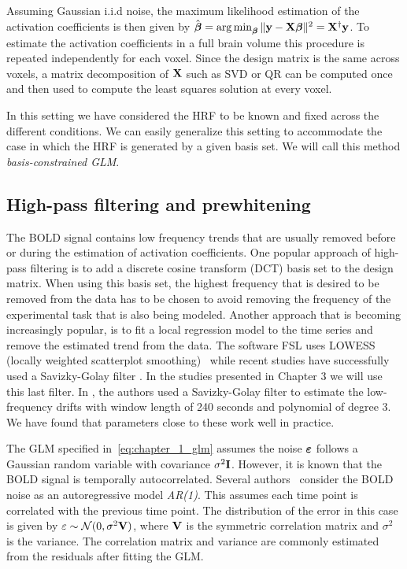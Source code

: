 Assuming Gaussian i.i.d noise, the maximum likelihood estimation of the activation coefficients is then given by $\hat{{\boldsymbol \beta}} = \operatorname*{arg\,min}_{{\boldsymbol \beta}}\|\mathbf{y} - \mathbf{X}{\boldsymbol \beta} \|^2 = \mathbf{X}^{\dagger} \mathbf{y}$. To estimate the activation coefficients in a full brain volume this procedure is repeated independently for each voxel. Since the design matrix is the same across voxels, a matrix decomposition of $\mathbf{X}$ such as SVD or QR can be computed once and then used to compute the least squares solution at every voxel.


In this setting we have considered the HRF to be known and fixed across the different conditions. We can easily generalize this setting to accommodate the case in which the HRF is generated by a given basis set. We will call this method \emph{basis-constrained GLM}.


\subsection{High-pass filtering and prewhitening}\label{subsec:prewhite}

The BOLD signal contains low frequency trends that are usually removed before or during the estimation of activation coefficients. One popular approach of high-pass filtering is to add a discrete cosine transform (DCT) basis set to the design matrix. When using this basis set, the highest frequency that is desired to be removed from the data has to be chosen to avoid removing the frequency of the experimental task that is also being modeled. Another approach that is becoming increasingly popular, is to fit a local regression model to the time series and remove the estimated trend from the data. The software FSL uses LOWESS (locally weighted scatterplot smoothing)~\citep{cleveland1979robust} while recent studies have successfully used a Savizky-Golay filter
\citep{barry2014enhanced,ccukur2013attention}. In the studies presented in Chapter 3 we will use this last filter.  In \citep{ccukur2013attention}, the authors used a Savizky-Golay filter to estimate the low-frequency drifts with window length of 240 seconds and polynomial of degree 3. We have found that parameters close to these work well in practice. 


The GLM specified in~\eqref{eq:chapter_1_glm} assumes the noise ${\boldsymbol \varepsilon}$ follows a Gaussian random variable with covariance $\sigma^2 \mathbf{I}$. However, it is known that the BOLD signal is temporally autocorrelated. Several authors~\citep{bullmore1996statistical,kruggel2000nonlinear} consider the BOLD noise as an autoregressive model \emph{AR(1)}. This assumes each time point is correlated with the previous time point. The distribution of the error in this case is given by $\varepsilon \sim \mathcal{N}(0, \sigma^2 \mathbf{V})$, where $\mathbf{V}$ is the symmetric correlation matrix and $\sigma^2$ is the variance. The correlation matrix and variance are commonly estimated from the residuals after fitting the GLM. 

